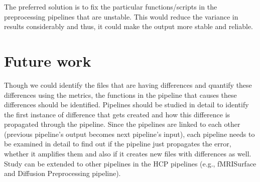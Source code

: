 The preferred solution is to fix the particular functions/scripts in the preprocessing pipelines that are unstable. This would reduce the variance in results considerably and thus, it could make the output more stable and reliable.

\section{Future work}
Though we could identify the files that are having differences and quantify these differences using the metrics, the functions in the pipeline that causes these differences should be identified.
Pipelines should be studied in detail to identify the first instance of difference that gets created and how this difference is propagated through the pipeline.
Since the pipelines are linked to each other (previous pipeline's output becomes next pipeline's input), each pipeline needs to be examined in detail to find out if the pipeline just propagates the error, whether it amplifies them and also if it creates new files with differences as well. 
Study can be extended to other pipelines in the HCP pipelines (e.g., fMRISurface and Diffusion Preprocessing pipeline).
